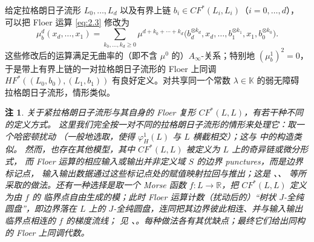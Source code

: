 \documentclass[UTF8,a4paper,11pt,fontset=windows]{ctexart}
\theoremstyle{cnthm}
\newtheorem{rem}[thm]{注}
\numberwithin{equation}{section}
\newcommand{\R}{\mathbb{R}}
\newcommand{\KK}{\mathbb{K}}          %
\newcommand{\CF}{CF}                  %
\newcommand{\HF}{HF}                  %
\begin{document}
给定拉格朗日子流形 $L_0,\dots,L_d$ 以及有界上链 $b_i\in\CF^{*}(L_i,L_i)$（$i=0,\dots,d$），
可以把 Floer 运算 \eqref{eq:2.3} 修改为
\begin{equation}\label{eq:2.5}
\mu^{d}_{b}(x_d,\dots,x_1)=\sum_{k_0,\dots,k_d\ge0}
\mu^{d+k_0+\cdots+k_d}\bigl(b_d^{\otimes k_d},x_d,\dots,b_1^{\otimes k_1},x_1,b_0^{\otimes k_0}\bigr).
\end{equation}
这些修改后的运算满足无曲率的（即不含 $\mu^{0}$ 的）$A_\infty$-关系；特别地
$(\mu^{1}_{b})^{2}=0$，于是带上有界上链的一对拉格朗日子流形的 Floer 上同调
$\HF^{*}((L_0,b_0),(L_1,b_1))$ 有良好定义。对共享同一个常数 $\lambda\in\KK$ 的弱无障碍
拉格朗日子流形，情形类似。


\begin{rem}\label{rem:2.1}
关于紧拉格朗日子流形与其自身的 Floer 复形 $\CF^{*}(L,L)$，有若干种不同的定义方式。
这里我们完全按一对不同的拉格朗日子流形的情形来处理它：取一个哈密顿扰动
（一般地选取，使得 $\varphi^{1}_{H}(L)$ 与 $L$ 横截相交）；这与 \cite{r92} 中的构造类似。
然而，也存在其他模型，其中 $\CF^{*}(L,L)$ 被定义为 $L$ 上的奇异链或微分形式，
而 Floer 运算的相应输入或输出并非定义域 $S$ 的边界 punctures，而是边界标记点，
输入输出数据通过这些标记点处的赋值映射拉回与推出；这是 \cite{r35}、\cite{r44}、\cite{r96}
等所采取的做法。还有一种选择是取一个 Morse 函数 $f:L\to\R$，把 $\CF^{*}(L,L)$ 定义为由 $f$ 的
临界点自由生成的模；此时 Floer 运算计数（扰动后的）“树状 $J$-全纯圆盘”，即边界落在 $L$ 上的
$J$-全纯圆盘，连同把其边界彼此相连、并与输入输出临界点相连的 $f$ 的梯度流线；
见 \cite{r27}、\cite{r32}。每种做法各有其优缺点；最终它们给出同构的 Floer 上同调代数。
\end{rem}

\end{document}
